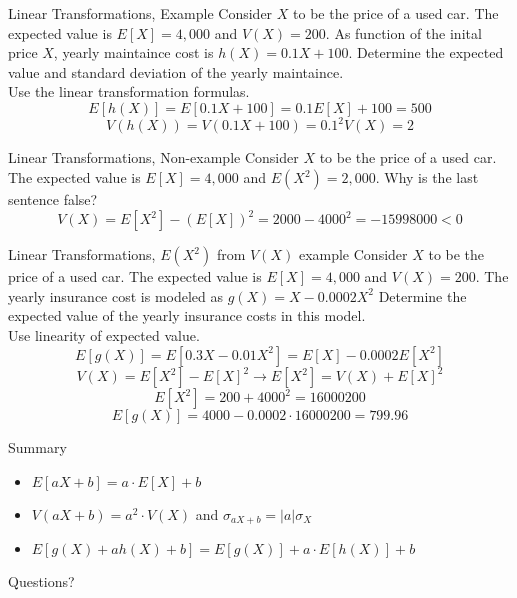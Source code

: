 \documentclass[handout]{beamer}
\newcommand{\qtns}[0]{\begin{center} Questions? \end{center}}
\newcommand{\nl}[1]{\vspace{#1 em}}
\begin{document}
\begin{frame}{Linear Transformations, Example}
    Consider $X$ to be the price of a used car. The expected value is $E[X] =4,000$ and $V(X) = 200$. As function of the inital price $X$, yearly maintaince cost is $h(X) = 0.1 X +100$. Determine the expected value and standard deviation of the yearly maintaince.
    \\ \nl{0.5}
    \pause Use the linear transformation formulas.
    $$ E[h(X)] = E[0.1 X + 100] = 0.1 E[X] + 100 = 500  $$
    $$ V(h(X)) = V(0.1 X + 100) = 0.1^2 V(X)  = 2  $$
\end{frame}

\begin{frame}{Linear Transformations, Non-example}
    Consider $X$ to be the price of a used car. The expected value is $E[X] =4,000$ and $E(X^2) = 2,000$. Why is the last sentence false?
    \\ \nl{0.5}
    \pause 
    $$ V(X) = E[X^2] - (E[X])^2 = 2000 - 4000^2 = -15998000 < 0 $$
\end{frame}

\begin{frame}{Linear Transformations, $E(X^2)$ from $V(X)$ example }
    Consider $X$ to be the price of a used car. The expected value is $E[X] =4,000$ and $V(X) = 200$. The yearly insurance cost is modeled as $g(X) = X - 0.0002 X^2$ Determine the expected value of the yearly insurance costs in this model.
    \\ \nl{0.5}
    \pause Use linearity of expected value.
    $$E[g(X)] = E[0.3 X - 0.01 X^2] = E[X] - 0.0002 E[X^2] $$
    \pause
    $$V(X) = E[X^2] - E[X]^2 \rightarrow E[X^2] = V(X) + E[X]^2$$ 
    $$ E[X^2] = 200 + 4000^2 = 16000200$$
    \pause
    $$ E[g(X)] =  4000 - 0.0002\cdot 16000200 = 799.96  $$
\end{frame}

\begin{frame}{Summary}
    \begin{itemize}
        \item $E[aX+b] = a\cdot E[X] + b$
        \item $V(aX+b) = a^2\cdot V(X)$ and $\sigma_{aX+b} = |a| \sigma_{X}$
        \item $E[g(X) + a h(X) + b] = E[g(X)] + a\cdot E[h(X)] + b$
    \end{itemize}
    \qtns
\end{frame}
\end{document}
